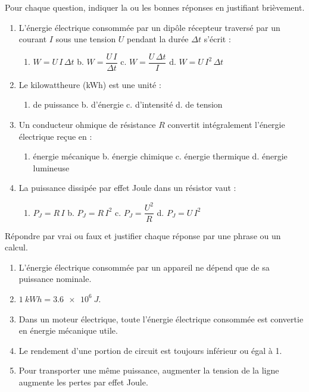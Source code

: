 \documentclass[11pt]{article}
\begin{document}
\begin{exercice}
Pour chaque question, indiquer la ou les bonnes réponses en justifiant brièvement.
\begin{enumerate}
\item L'énergie électrique consommée par un dipôle récepteur traversé par un courant $I$ sous une tension $U$ pendant la durée $\Delta t$ s'écrit :
\begin{enumerate}
\item[a.] $W = U\,I\,\Delta t$ \qquad b. $W = \dfrac{U\,I}{\Delta t}$ \qquad c. $W = \dfrac{U\,\Delta t}{I}$ \qquad d. $W = U\,I^2\,\Delta t$
\end{enumerate}
\item Le kilowattheure (kWh) est une unité :
\begin{enumerate}
\item[a.] de puissance \qquad b. d'énergie \qquad c. d'intensité \qquad d. de tension
\end{enumerate}
\item Un conducteur ohmique de résistance $R$ convertit intégralement l'énergie électrique reçue en :
\begin{enumerate}
\item[a.] énergie mécanique \qquad b. énergie chimique \qquad c. énergie thermique \qquad d. énergie lumineuse
\end{enumerate}
\item La puissance dissipée par effet Joule dans un résistor vaut :
\begin{enumerate}
\item[a.] $P_J = R\,I$ \qquad b. $P_J = R\,I^2$ \qquad c. $P_J = \dfrac{U^2}{R}$ \qquad d. $P_J = U\,I^2$
\end{enumerate}
\end{enumerate}
\end{exercice}

\begin{exercice}
Répondre par vrai ou faux et justifier chaque réponse par une phrase ou un calcul.
\begin{enumerate}
\item L'énergie électrique consommée par un appareil ne dépend que de sa puissance nominale.
\item $\SI{1}{kWh} = \SI{3,6e6}{J}$.
\item Dans un moteur électrique, toute l'énergie électrique consommée est convertie en énergie mécanique utile.
\item Le rendement d'une portion de circuit est toujours inférieur ou égal à 1.
\item Pour transporter une même puissance, augmenter la tension de la ligne augmente les pertes par effet Joule.
\end{enumerate}
\end{exercice}
\end{document}
